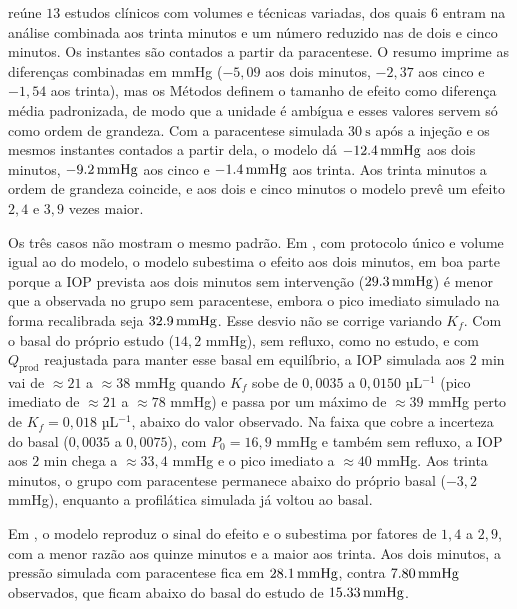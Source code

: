 \citet{zaman2025} reúne $13$ estudos clínicos com volumes e técnicas variadas, dos quais $6$ entram na análise combinada aos trinta minutos e um número reduzido nas de dois e cinco minutos. Os instantes são contados a partir da paracentese. O resumo imprime as diferenças combinadas em mmHg ($-5{,}09$ aos dois minutos, $-2{,}37$ aos cinco e $-1{,}54$ aos trinta), mas os Métodos definem o tamanho de efeito como diferença média padronizada, de modo que a unidade é ambígua e esses valores servem só como ordem de grandeza. Com a paracentese simulada $\SI{30}{\second}$ após a injeção e os mesmos instantes contados a partir dela, o modelo dá $\SI{-12{,}4}{\milli\meter Hg}$ aos dois minutos, $\SI{-9{,}2}{\milli\meter Hg}$ aos cinco e $\SI{-1{,}4}{\milli\meter Hg}$ aos trinta. Aos trinta minutos a ordem de grandeza coincide, e aos dois e cinco minutos o modelo prevê um efeito $2{,}4$ e $3{,}9$ vezes maior.

Os três casos não mostram o mesmo padrão. Em \citet{soheilian2017}, com protocolo único e volume igual ao do modelo, o modelo subestima o efeito aos dois minutos, em boa parte porque a IOP prevista aos dois minutos sem intervenção ($\SI{29{,}3}{\milli\meter Hg}$) é menor que a observada no grupo sem paracentese, embora o pico imediato simulado na forma recalibrada seja $\SI{32{,}9}{\milli\meter Hg}$. Esse desvio não se corrige variando $K_f$. Com o basal do próprio estudo ($14{,}2$ mmHg), sem refluxo, como no estudo, e com $Q_{\text{prod}}$ reajustada para manter esse basal em equilíbrio, a IOP simulada aos $2$ min vai de $\approx21$ a $\approx38$ mmHg quando $K_f$ sobe de $0{,}0035$ a $0{,}0150$ µL$^{-1}$ (pico imediato de $\approx21$ a $\approx78$ mmHg) e passa por um máximo de $\approx39$ mmHg perto de $K_f=0{,}018$ µL$^{-1}$, abaixo do valor observado. Na faixa que cobre a incerteza do basal ($0{,}0035$ a $0{,}0075$), com $P_0=16{,}9$ mmHg e também sem refluxo, a IOP aos $2$ min chega a $\approx33{,}4$ mmHg e o pico imediato a $\approx40$ mmHg. Aos trinta minutos, o grupo com paracentese permanece abaixo do próprio basal ($-3{,}2$ mmHg), enquanto a profilática simulada já voltou ao basal.

Em \citet{changchung2007}, o modelo reproduz o sinal do efeito e o subestima por fatores de $1{,}4$ a $2{,}9$, com a menor razão aos quinze minutos e a maior aos trinta. Aos dois minutos, a pressão simulada com paracentese fica em $\SI{28{,}1}{\milli\meter Hg}$, contra $\SI{7{,}80}{\milli\meter Hg}$ observados, que ficam abaixo do basal do estudo de $\SI{15{,}33}{\milli\meter Hg}$.

